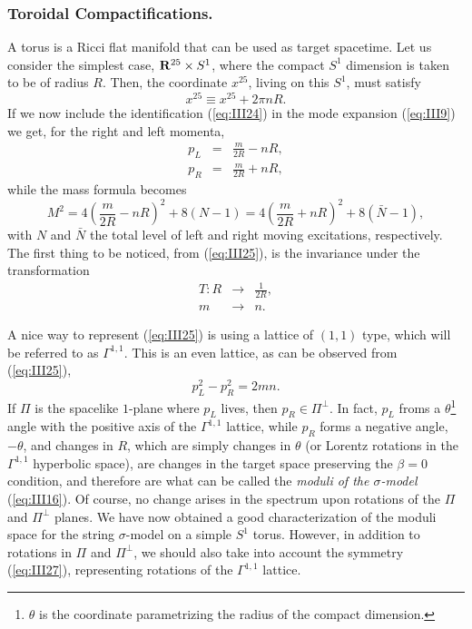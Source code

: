 \subsubsection{Toroidal Compactifications.}

A torus is a Ricci flat manifold that can be used as target spacetime. Let us 
consider the simplest case, ${\bf R}^{25} \times S^1$, where the compact 
$S^1$ dimension is taken to be of radius $R$. Then, the coordinate 
$x^{25}$, living on this $S^1$, must satisfy
\begin{equation}
x^{25} \equiv x^{25} + 2 \pi n R.
\label{eq:III24}
\end{equation}
If we now include the identification (\ref{eq:III24}) in the mode expansion 
(\ref{eq:III9}) we get, for the right and left momenta,
\begin{eqnarray}
p_L & = & \frac {m}{2R} -nR, \nonumber \\
p_R & = & \frac {m}{2R} +nR, 
\label{eq:III25}
\end{eqnarray}
while the mass formula becomes
\begin{equation}
M^2 = 4 \left( \frac {m}{2R}- nR \right)^2 + 8(N-1) = 4 \left( 
\frac {m}{2R} +nR \right)^2 + 8 (\bar{N}-1),
\label{eq:III26}
\end{equation}
with $N$ and $\bar{N}$ the total level of left and right moving excitations, respectively. 
The first thing to be noticed, from (\ref{eq:III25}), is the invariance under the 
transformation
\begin{eqnarray}
T: R & \rightarrow & \frac {1}{2R}, \nonumber \\
   m & \rightarrow & n.
\label{eq:III27}
\end{eqnarray}
  
A nice way to represent (\ref{eq:III25}) is using a lattice of $(1,1)$ type, 
which will be referred to as $\Gamma^{1,1}$. 
This is an even lattice, as can be observed  
from (\ref{eq:III25}),
\begin{equation}
p_L^2-p_R^2 =2mn.
\label{eq:III28}
\end{equation}
If $\Pi$ is the spacelike $1$-plane where $p_L$ lives, then 
$p_R \in \Pi^{\perp}$. In fact, $p_L$ froms a $\theta$\footnote{$\theta$  
is the coordinate parametrizing the radius of the compact dimension.} angle with 
the positive axis of the $\Gamma^{1,1}$ lattice, while $p_R$ forms a 
negative angle, $- \theta$, and changes in $R$, which are simply 
changes in $\theta$ (or Lorentz rotations in the $\Gamma^{1,1}$ 
hyperbolic space), are changes in the target space preserving the $\beta=0$ 
condition, and therefore are what can be called the {\em moduli of the 
$\sigma$-model} (\ref{eq:III16}). Of course, no change arises in the 
spectrum upon rotations of the $\Pi$ and $\Pi^{\perp}$ planes. We have 
now obtained a good characterization of the moduli space for the 
string $\sigma$-model on a simple $S^1$ torus. However, in addition 
to rotations in $\Pi$ and $\Pi^{\perp}$, we should also take into account 
the symmetry (\ref{eq:III27}), representing rotations of the $\Gamma^{1,1}$ 
lattice. 
  
